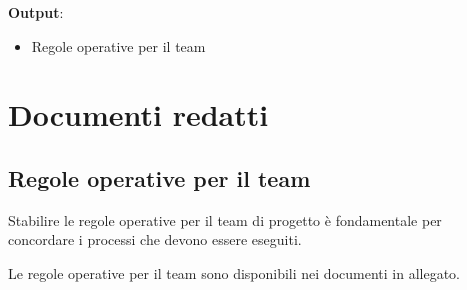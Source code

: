 \textbf{Output}:
\begin{itemize}
    \item Regole operative per il team
\end{itemize}

\section{Documenti redatti}

\subsection{Regole operative per il team}
Stabilire le regole operative per il team di progetto è fondamentale per concordare i processi che devono essere
eseguiti.

Le regole operative per il team sono disponibili nei documenti in allegato.
